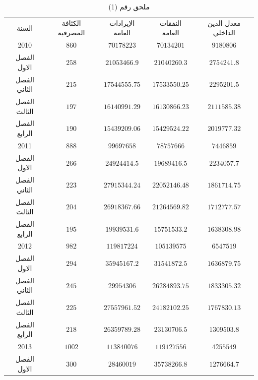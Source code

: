 \documentclass[10pt,a4paper]{report}
\begin{document}
	\begin{longtable}{|c|c|c|c|c|}
		\captionsetup{font=Large}
		\caption*{ملحق رقم (1)} \\
\hline
\rowcolor[HTML]{DAE8FC} 
السنة        & الكثافة المصرفية & الإيرادات العامة & النفقات العامة & معدل الدين الداخلي \\ \hline
2010         & $860$            & $70178223$       & $70134201$     & $9180806$          \\ \hline
الفصل الاول  & $258$            & $21053466.9$     & $21040260.3$   & $2754241.8$        \\ \hline
الفصل الثاني & $215$            & $17544555.75$    & $17533550.25$  & $2295201.5$        \\ \hline
الفصل الثالث & $197$            & $16140991.29$    & $16130866.23$  & $2111585.38$       \\ \hline
الفصل الرابع & $190$            & $15439209.06$    & $15429524.22$  & $2019777.32$       \\ \hline
2011         & $888$            & $99697658$       & $78757666$     & $7446859$          \\ \hline
الفصل الاول  & $266$            & $24924414.5$     & $19689416.5$   & $2234057.7$        \\ \hline
الفصل الثاني & $223$            & $27915344.24$    & $22052146.48$  & $1861714.75$       \\ \hline
الفصل الثالث & $204$            & $26918367.66$    & $21264569.82$  & $1712777.57$       \\ \hline
الفصل الرابع & $195$            & $19939531.6$     & $15751533.2$   & $1638308.98$       \\ \hline
2012         & $982$            & $119817224$      & $105139575$    & $6547519$          \\ \hline
الفصل الاول  & $294$            & $35945167.2$     & $31541872.5$   & $1636879.75$       \\ \hline
الفصل الثاني & $245$            & $29954306$       & $26284893.75$  & $1833305.32$       \\ \hline
الفصل الثالث & $225$            & $27557961.52$    & $24182102.25$  & $1767830.13$       \\ \hline
الفصل الرابع & $218$            & $26359789.28$    & $23130706.5$   & $1309503.8$        \\ \hline
2013         & $1002$           & $113840076$      & $119127556$    & $4255549$          \\ \hline
الفصل الاول  & $300$            & $28460019$       & $35738266.8$   & $1276664.7$        \\ \hline

\end{longtable}
\end{document}
